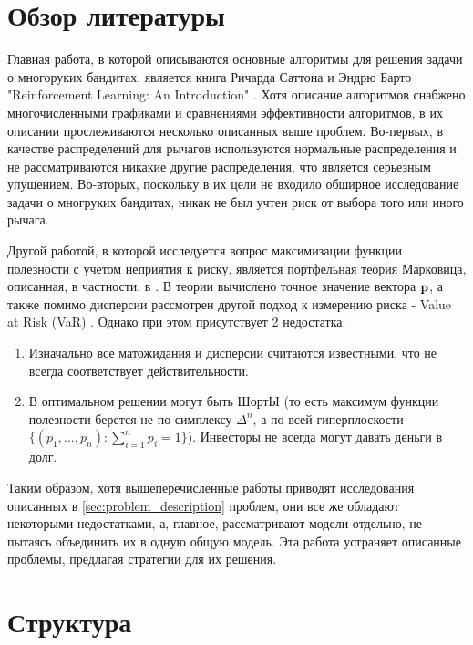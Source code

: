\section{Обзор литературы}

Главная работа, в которой описываются основные алгоритмы для решения задачи о многоруких бандитах, является книга Ричарда Саттона и Эндрю Барто "Reinforcement Learning: An Introduction" \cite{bouchaudpotters}. Хотя описание алгоритмов снабжено многочисленными графиками и сравнениями эффективности алгоритмов, в их описании прослеживаются несколько описанных выше проблем. Во-первых, в качестве распределений для рычагов используются нормальные распределения и не рассматриваются никакие другие распределения, что является серьезным упущением. Во-вторых, поскольку в их цели не входило обширное исследование задачи о многруких бандитах, никак не был учтен риск от выбора того или иного рычага.

Другой работой, в которой исследуется вопрос максимизации функции полезности с учетом неприятия к риску, является портфельная теория Марковица, описанная, в частности, в \cite{bouchaudpotters}. В теории вычислено точное значение вектора $\textbf{p}$, а также помимо дисперсии рассмотрен другой подход к измерению риска - Value at Risk (VaR) \cite{varbouchaudpotters}. Однако при этом присутствует 2 недостатка:
\begin{enumerate}
    \item Изначально все матожидания и дисперсии считаются известными, что не всегда соответствует действительности.
    \item В оптимальном решении могут быть ШортЫ (то есть максимум функции полезности берется не по симплексу $\Delta^n$, а по всей гиперплоскости $\{(p_1, ..., p_n): \sum_{i=1}^n p_i = 1\}$). Инвесторы не всегда могут давать деньги в долг.
\end{enumerate}

Таким образом, хотя вышеперечисленные работы приводят исследования описанных в \ref{sec:problem_description} проблем, они все же обладают некоторыми недостатками, а, главное, рассматривают модели отдельно, не пытаясь объединить их в одную общую модель. Эта работа устраняет описанные проблемы, предлагая стратегии для их решения.

\section{Структура}

